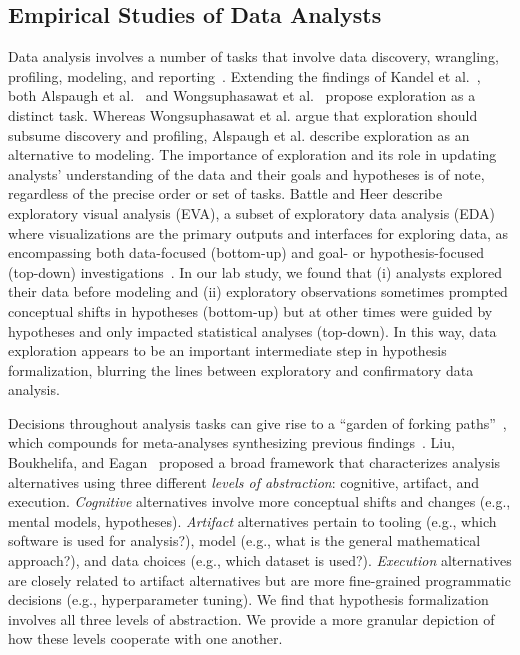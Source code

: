 \subsection{Empirical Studies of Data Analysts}
Data analysis involves a number of tasks that involve data discovery, wrangling,
profiling, modeling, and reporting~\cite{kandel2012enterprise}. Extending the findings of
Kandel et al.~\cite{kandel2012enterprise}, both Alspaugh et al.~\cite{alspaugh2018futzing} and
Wongsuphasawat et al.~\cite{wongsuphasawat2019EDAgoals}
propose exploration as a distinct task.
Whereas Wongsuphasawat et al. argue that exploration should subsume
discovery and profiling, Alspaugh et al. describe exploration as an alternative
to modeling. The importance of exploration and its role in updating analysts'
understanding of the data and their goals and hypotheses is of note, regardless
of the precise order or set of tasks. Battle and Heer describe exploratory
visual analysis (EVA), a subset of exploratory data analysis (EDA) where
visualizations are the primary outputs and interfaces for exploring data, as
encompassing both data-focused (bottom-up) and goal- or hypothesis-focused
(top-down) investigations~\cite{battle2019EVA}. In our lab study, we found that
(i) analysts explored their data before modeling and (ii) exploratory
observations sometimes prompted conceptual shifts in hypotheses (bottom-up) but
at other times were guided by hypotheses and only impacted statistical
analyses (top-down). In this way, data exploration appears to be an important
intermediate step in hypothesis formalization, blurring the lines between
exploratory and confirmatory data analysis. 

Decisions throughout analysis tasks can give rise to a ``garden of forking
paths''~\cite{gelman2013garden}, which compounds for meta-analyses synthesizing
previous findings~\cite{kale2019decision}. Liu, Boukhelifa, and
Eagan~\cite{liu2019understanding} proposed a broad framework that characterizes
analysis alternatives using three different \textit{levels of abstraction}:
cognitive, artifact, and execution. \textit{Cognitive} alternatives involve more
conceptual shifts and changes (e.g., mental models, hypotheses).
\textit{Artifact} alternatives pertain to tooling (e.g., which software is used
for analysis?), model (e.g., what is the general mathematical approach?), and
data choices (e.g., which dataset is used?). \textit{Execution} alternatives are
closely related to artifact alternatives but are more fine-grained programmatic
decisions (e.g., hyperparameter tuning). We find that hypothesis formalization
involves all three levels of abstraction. We provide a more granular depiction
of how these levels cooperate with one another. 

